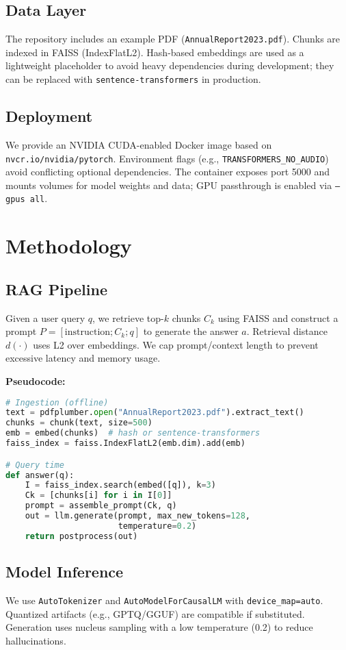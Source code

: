 \documentclass[conference]{IEEEtran}
\begin{document}
\subsection{Data Layer}
The repository includes an example PDF (\texttt{AnnualReport2023.pdf}). Chunks are indexed in FAISS (IndexFlatL2). Hash-based embeddings are used as a lightweight placeholder to avoid heavy dependencies during development; they can be replaced with \texttt{sentence-transformers} in production.

\subsection{Deployment}
We provide an NVIDIA CUDA-enabled Docker image based on \texttt{nvcr.io/nvidia/pytorch}. Environment flags (e.g., \texttt{TRANSFORMERS\_NO\_AUDIO}) avoid conflicting optional dependencies. The container exposes port 5000 and mounts volumes for model weights and data; GPU passthrough is enabled via \texttt{--gpus all}.

\section{Methodology}
\subsection{RAG Pipeline}
Given a user query $q$, we retrieve top-$k$ chunks $C_k$ using FAISS and construct a prompt $P=[\text{instruction}; C_k; q]$ to generate the answer $a$. Retrieval distance $d(\cdot)$ uses L2 over embeddings. We cap prompt/context length to prevent excessive latency and memory usage.

\noindent\textbf{Pseudocode:}
\begin{lstlisting}[language=Python,basicstyle=\ttfamily\small]
# Ingestion (offline)
text = pdfplumber.open("AnnualReport2023.pdf").extract_text()
chunks = chunk(text, size=500)
emb = embed(chunks)  # hash or sentence-transformers
faiss_index = faiss.IndexFlatL2(emb.dim).add(emb)

# Query time
def answer(q):
    I = faiss_index.search(embed([q]), k=3)
    Ck = [chunks[i] for i in I[0]]
    prompt = assemble_prompt(Ck, q)
    out = llm.generate(prompt, max_new_tokens=128,
                       temperature=0.2)
    return postprocess(out)
\end{lstlisting}

\subsection{Model Inference}
We use \texttt{AutoTokenizer} and \texttt{AutoModelForCausalLM} with \texttt{device\_map=auto}. Quantized artifacts (e.g., GPTQ/GGUF) are compatible if substituted. Generation uses nucleus sampling with a low temperature (0.2) to reduce hallucinations.
\end{document}
